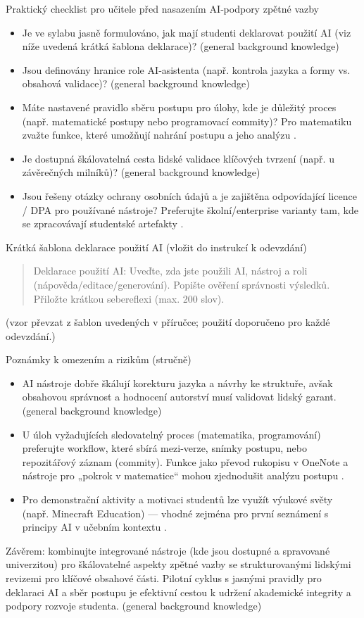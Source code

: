Praktický checklist pro učitele před nasazením AI‑podpory zpětné vazby
\begin{itemize}
  \item Je ve sylabu jasně formulováno, jak mají studenti deklarovat použití AI (viz níže uvedená krátká šablona deklarace)? (general background knowledge)
  \item Jsou definovány hranice role AI‑asistenta (např. kontrola jazyka a formy vs. obsahová validace)? (general background knowledge)
  \item Máte nastavené pravidlo sběru postupu pro úlohy, kde je důležitý proces (např. matematické postupy nebo programovací commity)? Pro matematiku zvažte funkce, které umožňují nahrání postupu a jeho analýzu \cite{kb_ai_101_tipu_pdf_04e4a115_page_8_1}.
  \item Je dostupná škálovatelná cesta lidské validace klíčových tvrzení (např. u závěrečných milníků)? (general background knowledge)
  \item Jsou řešeny otázky ochrany osobních údajů a je zajištěna odpovídající licence / DPA pro používané nástroje? Preferujte školní/enterprise varianty tam, kde se zpracovávají studentské artefakty \cite{kb_ai_101_tipu_pdf_04e4a115_page_3_1}.
\end{itemize}

Krátká šablona deklarace použití AI (vložit do instrukcí k odevzdání)
\begin{quote}
  Deklarace použití AI: Uveďte, zda jste použili AI, nástroj a roli (nápověda/editace/generování). Popište ověření správnosti výsledků. Přiložte krátkou sebereflexi (max. 200 slov).
\end{quote}
(vzor převzat z šablon uvedených v příručce; použití doporučeno pro každé odevzdání.)

Poznámky k omezením a rizikům (stručně)
\begin{itemize}
  \item AI nástroje dobře škálují korekturu jazyka a návrhy ke struktuře, avšak obsahovou správnost a hodnocení autorství musí validovat lidský garant. (general background knowledge)
  \item U úloh vyžadujících sledovatelný proces (matematika, programování) preferujte workflow, které sbírá mezi‑verze, snímky postupu, nebo repozitářový záznam (commity). Funkce jako převod rukopisu v OneNote a nástroje pro „pokrok v matematice“ mohou zjednodušit analýzu postupu \cite{kb_ai_101_tipu_pdf_04e4a115_page_8_1}.
  \item Pro demonstrační aktivity a motivaci studentů lze využít výukové světy (např. Minecraft Education) — vhodné zejména pro první seznámení s principy AI v učebním kontextu \cite{kb_ai_101_tipu_pdf_04e4a115_page_15_2}.
\end{itemize}

Závěrem: kombinujte integrované nástroje (kde jsou dostupné a spravované univerzitou) pro škálovatelné aspekty zpětné vazby se strukturovanými lidskými revizemi pro klíčové obsahové části. Pilotní cyklus s jasnými pravidly pro deklaraci AI a sběr postupu je efektivní cestou k udržení akademické integrity a podpory rozvoje studenta. (general background knowledge)
